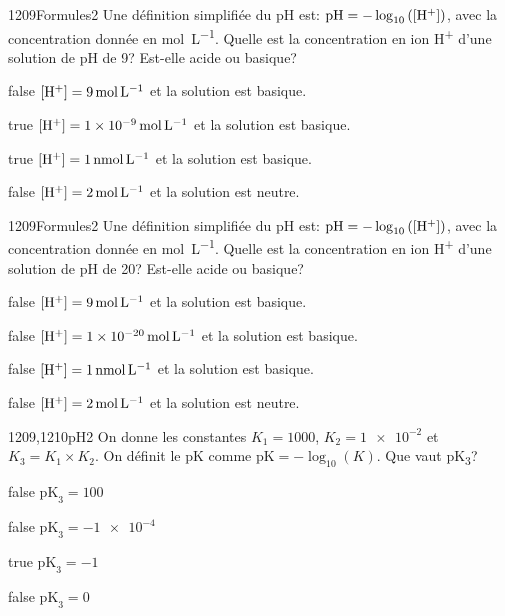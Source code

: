 \documentclass[11pt]{article}
\begin{document}
		\begin{question}{1209}{Formules}{2}{}
            Une définition simplifiée du pH est: $\text{pH} = -\log_{10}\left(\text{[H\textsuperscript{+}]}\right)$, avec la concentration donnée en \si{\mol\per\liter}. Quelle est la concentration en ion H\textsuperscript{+} d'une solution de pH de 9? Est-elle acide ou basique?
        \end{question}
        \begin{reponses}
    	    \item[false] $\text{[H\textsuperscript{+}]} = \SI{9}{\mol\per\liter}$ et la solution est basique.
    	    \item[true] $\text{[H\textsuperscript{+}]} = \SI{1e-9}{\mol\per\liter}$ et la solution est basique.
    	    \item[true] $\text{[H\textsuperscript{+}]} = \SI{1}{\nano\mol\per\liter}$ et la solution est basique.
    	    \item[false] $\text{[H\textsuperscript{+}]} = \SI{2}{\mol\per\liter}$ et la solution est neutre.
        \end{reponses}
        
        \begin{question}{1209}{Formules}{2}{}
			Une définition simplifiée du pH est: $\text{pH} = -\log_{10}\left(\text{[H\textsuperscript{+}]}\right)$, avec la concentration donnée en \si{\mol\per\liter}. Quelle est la concentration en ion H\textsuperscript{+} d'une solution de pH de 20? Est-elle acide ou basique?
        \end{question}
        \begin{reponses}
    	    \item[false] $\text{[H\textsuperscript{+}]} = \SI{9}{\mol\per\liter}$ et la solution est basique.
    	    \item[false] $\text{[H\textsuperscript{+}]} = \SI{1e-20}{\mol\per\liter}$ et la solution est basique.
    	    \item[false] $\text{[H\textsuperscript{+}]} = \SI{1}{\nano\mol\per\liter}$ et la solution est basique.
    	    \item[false] $\text{[H\textsuperscript{+}]} = \SI{2}{\mol\per\liter}$ et la solution est neutre.
        \end{reponses}
        
        \begin{question}{1209,1210}{pH}{2}{}
			On donne les constantes $K_1 = 1000$, $K_2 = \num{1e-2}$ et $K_3 = K_1\times K_2$. On définit le pK comme $\text{pK} = -\log_{10}\left(K\right)$. Que vaut pK\textsubscript{3}?
        \end{question}
        \begin{reponses}
    	    \item[false] $\text{pK}_3 = 100$
    	    \item[false] $\text{pK}_3 = \num{-1e-4}$
    	    \item[true] $\text{pK}_3 = -1$
    	    \item[false] $\text{pK}_3 = 0$
        \end{reponses}
		
\end{document}
